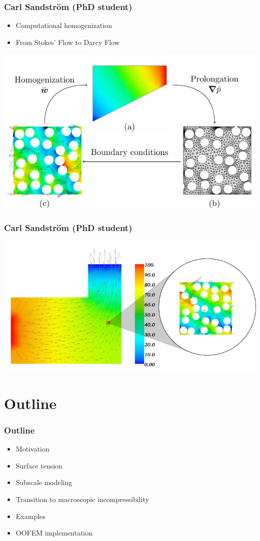 \documentclass[11pt]{beamer} %
\begin{document}
\begin{frame}
\frametitle{Carl Sandström (PhD student)}
 \begin{itemize}
  \item Computational homogenization
  \item From Stokes' Flow to Darcy Flow
 \end{itemize}
 \begin{center}
 \includegraphics[width=0.8\linewidth]{figures/Bild1-crop.pdf}
 \end{center}
\end{frame}

\begin{frame}
 \frametitle{Carl Sandström (PhD student)}
 \includegraphics[width=1\linewidth]{figures/FrontPage-crop.pdf}
\end{frame}

\section{Outline}
\begin{frame}
 \frametitle{Outline}

\begin{itemize}
 \item Motivation
 \item Surface tension
 \item Subscale modeling
 \item Transition to macroscopic incompressibility
 \item Examples
 \item OOFEM implementation
\end{itemize}
\end{frame}
\end{document}
